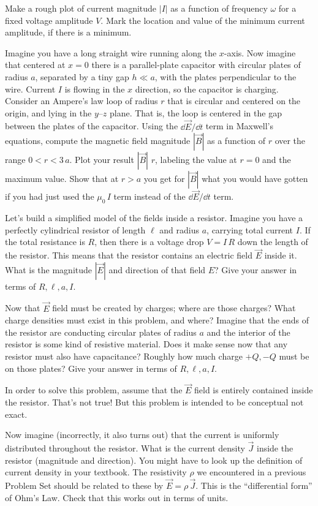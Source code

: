 \documentclass[12pt]{article}
\begin{document}
Make a rough plot of current magnitude $|I|$ as a function of
frequency $\omega$ for a fixed voltage amplitude $V$. Mark the
location and value of the minimum current amplitude, if there
is a minimum.

\startproblem%
Imagine you have a long straight wire running along the $x$-axis.
Now imagine that centered at $x=0$ there is a parallel-plate capacitor
with circular plates of radius $a$, separated by a tiny gap $h\ll a$,
with the plates perpendicular to the wire.
Current $I$ is flowing in the $x$ direction, so the capacitor is charging.
Consider an Ampere's law loop of radius $r$ that is circular
and centered on the origin, and lying in the $y$--$z$ plane.
That is, the loop is centered in the gap between the plates of the capacitor.
Using the $\dd\vec{E}/\dd t$ term in Maxwell's equations,
compute the magnetic field magnitude $|\vec{B}|$ as a function of $r$ over
the range $0<r<3\,a$.
Plot your result $|\vec{B}|$  $r$, labeling the value at
$r=0$ and the maximum value.
Show that at $r>a$ you get for $|\vec{B}|$ what you would have gotten if you had just used
the $\mu_0\,I$ term instead of the $\dd\vec{E}/\dd t$ term.

\startproblem%
Let's build a simplified model of the fields inside a resistor.
Imagine you have a perfectly cylindrical resistor of length $\ell$ and
radius $a$, carrying total current $I$. If the total resistance is $R$,
then there is a voltage drop $V=I\,R$ down the length of the resistor. This
means that the resistor contains an electric field $\vec{E}$ inside it. What is
the magnitude $|\vec{E}|$ and direction of that field $E$?
Give your answer in terms of $R, \ell, a, I$.

Now that $\vec{E}$ field must be created by charges; where are those charges?
What charge densities must exist in this problem, and where? Imagine that
the ends of the resistor are conducting circular plates of radius $a$ and
the interior of the resistor is some kind of resistive material. Does it
make sense now that any resistor must also have capacitance? Roughly how
much charge $+Q, -Q$ must be on those plates?
Give your answer in terms of $R, \ell, a, I$.

In order to solve this problem, assume that the $\vec{E}$ field is entirely
contained inside the resistor. That's not true! But this problem is intended
to be conceptual not exact.

Now imagine (incorrectly, it also turns out) that the current is uniformly distributed
throughout the resistor. What is the current density $\vec{J}$ inside the
resistor (magnitude and direction). You might have to look up the definition
of current density in your textbook. The resistivity $\rho$ we encountered in a
previous Problem Set should be related to these by $\vec{E}=\rho\,\vec{J}$.
This is the ``differential form'' of Ohm's Law.
Check that this works out in terms of units.
\end{document}
